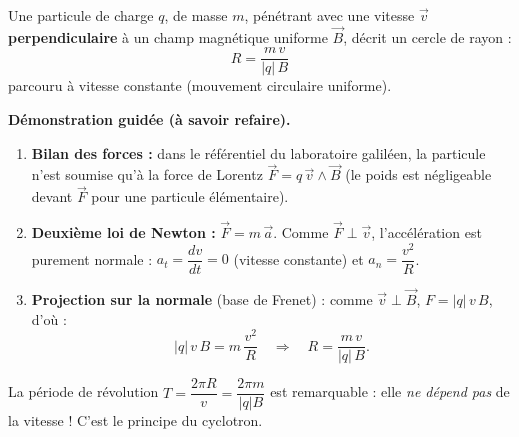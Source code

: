\documentclass[11pt]{article}
\newcommand{\cle}[1]{{\popxbold\color{popdark}#1}}
\begin{document}
\begin{propriete}
Une particule de charge $q$, de masse $m$, pénétrant avec une vitesse $\vec{v}$ \textbf{perpendiculaire} à un champ magnétique uniforme $\vec{B}$, décrit un \cle{cercle} de rayon :
\[ R = \frac{m\,v}{|q|\,B} \]
parcouru à vitesse constante (mouvement circulaire uniforme).

\textbf{Démonstration guidée (à savoir refaire).}
\begin{enumerate}
\item \textbf{Bilan des forces :} dans le référentiel du laboratoire galiléen, la particule n'est soumise qu'à la force de Lorentz $\vec{F} = q\,\vec{v}\wedge\vec{B}$ (le poids est négligeable devant $\vec{F}$ pour une particule élémentaire).
\item \textbf{Deuxième loi de Newton :} $\vec{F} = m\,\vec{a}$. Comme $\vec{F}\perp\vec{v}$, l'accélération est purement normale : $a_t = \dfrac{dv}{dt} = 0$ (vitesse constante) et $a_n = \dfrac{v^2}{R}$.
\item \textbf{Projection sur la normale} (base de Frenet) : comme $\vec{v}\perp\vec{B}$, $F = |q|\,v\,B$, d'où :
\[ |q|\,v\,B = m\,\frac{v^2}{R} \quad\Longrightarrow\quad R = \frac{m\,v}{|q|\,B}. \]
\end{enumerate}
La période de révolution $T = \dfrac{2\pi R}{v} = \dfrac{2\pi m}{|q|B}$ est remarquable : elle \emph{ne dépend pas} de la vitesse ! C'est le principe du cyclotron.
\end{propriete}
\end{document}
